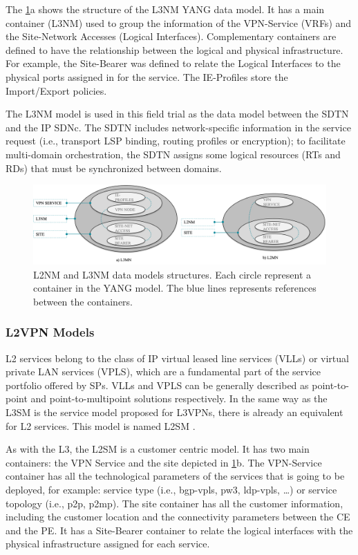 \documentclass[a4paper,fleqn]{cas-dc}
\begin{document}
The \cref{FIG:l3nm}a shows the structure of the L3NM YANG data model. It has a  main container (L3NM) used to group the information of the VPN-Service (VRFs) and the Site-Network Accesses (Logical Interfaces). Complementary containers are defined to have the relationship between the logical and physical infrastructure. For example, the Site-Bearer was defined to relate the Logical Interfaces to the physical ports assigned in for the service. The IE-Profiles store the Import/Export policies.  

The L3NM model is used in this field trial as the data model between the SDTN and the IP SDNc. The SDTN includes network-specific information in the service request (i.e., transport LSP binding, routing profiles or encryption); to facilitate multi-domain orchestration, the SDTN assigns some logical resources (RTs and RDs) that must be synchronized between domains.

\begin{figure}
	\centering
		\includegraphics[scale=0.55]{figs/L3NM_L2NM.png}
	\caption{L2NM and L3NM data models structures. Each circle represent a container in the YANG model. The blue lines represents references between the containers.}
	\label{FIG:l3nm} 
\end{figure}

\subsubsection{L2VPN Models}
\label{section:l2nm}

L2 services belong to the class of IP virtual leased line services (VLLs) or virtual private LAN services (VPLS)\cite{andersson2006framework}, which are a fundamental part of the service portfolio offered by SPs. VLLs and VPLS can be generally described as point-to-point and point-to-multipoint solutions respectively. In the same way as the L3SM is the service model proposed for L3VPNs, there is already an equivalent for L2 services. This model is named L2SM \cite{wen2018yang}. 

As with the L3, the L2SM is a customer centric model. It has two main containers: the VPN Service and the site depicted in \cref{FIG:l3nm}b. The VPN-Service container has all the technological parameters of the services that is going to be deployed, for example: service type (i.e., bgp-vpls, pw3, ldp-vpls, \dots) or service topology (i.e., p2p, p2mp). The site container has all the customer information, including the customer location and the connectivity parameters between the CE and the PE. It has a Site-Bearer container to relate the logical interfaces with the physical infrastructure assigned for each service.
\end{document}
